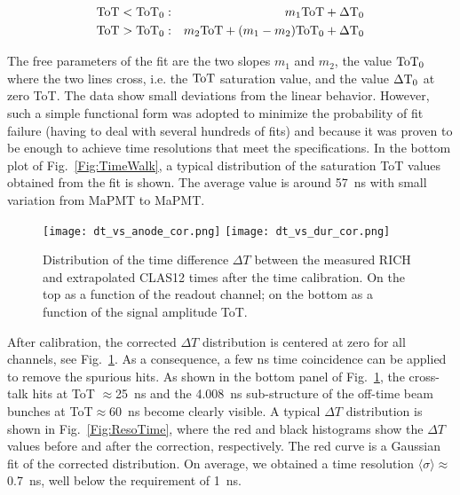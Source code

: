 \documentclass[5p,times,twocolumn]{elsarticle}
\def\dT{$\Delta T$ }
\def\ToT{\small{\rm ToT}}
\def\DT{\small{\rm \Delta T}}
\begin{document}
\begin{eqnarray}
\ToT<\ToT_0 &:& m_1 \ToT + \DT_0   \nonumber \\
\ToT>\ToT_0 &:& m_2 \ToT + (m_1 - m_2) \ToT_0  + \DT_0  
\end{eqnarray}

The free parameters of the fit are the two slopes $m_1$ and $m_2$, the value $\ToT_0$ where the two lines cross,
i.e. the $\ToT$ saturation value, and the value $\DT_0$ at zero ToT. The data show small deviations from the linear behavior.
However, such a simple functional form was adopted to minimize the probability of fit failure (having to deal with
several hundreds of fits) and because it was proven to be enough to achieve time resolutions that meet the
specifications. In the bottom plot of Fig.~\ref{Fig:TimeWalk}, a typical distribution of the saturation ToT values
obtained from the fit is shown. The average value is around 57~ns with small variation from MaPMT to MaPMT.

\begin{figure}[t]
\begin{center}
\texttt{[image: dt\_vs\_anode\_cor.png]}
\texttt{[image: dt\_vs\_dur\_cor.png]}
\end{center}
\caption{Distribution of the time difference \dT between the measured RICH and extrapolated CLAS12 times after
  the time calibration. On the top as a function of the readout channel; on the bottom as a function of the signal amplitude ToT.}
\label{Fig:DT_corr}
\end{figure}

After calibration, the corrected $\Delta T$ distribution is centered at zero for all channels, see
Fig.~\ref{Fig:DT_corr}. As a consequence, a few ns time coincidence can be applied to remove the spurious hits. As
shown in the bottom panel of Fig.~\ref{Fig:DT_corr}, the cross-talk hits at ToT $\approx$25~ns and the 4.008~ns
sub-structure of the off-time beam bunches at ToT$\approx$60~ns become clearly visible. A typical \dT
distribution is shown in Fig.~\ref{Fig:ResoTime}, where the red and black histograms show the
$\Delta T$ values before and after the correction, respectively. The red curve is a Gaussian fit of the
corrected distribution.
On average, we obtained a time resolution $\langle\sigma\rangle \approx$0.7~ns, well below the requirement of 1~ns.
\end{document}

